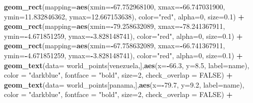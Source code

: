 \documentclass[12pt,oneside]{reedthesis}
\newenvironment{Shaded}{\begin{snugshade}}{\end{snugshade}}
\newcommand{\DataTypeTok}[1]{\textcolor[rgb]{0.13,0.29,0.53}{#1}}
\newcommand{\DecValTok}[1]{\textcolor[rgb]{0.00,0.00,0.81}{#1}}
\newcommand{\FloatTok}[1]{\textcolor[rgb]{0.00,0.00,0.81}{#1}}
\newcommand{\KeywordTok}[1]{\textcolor[rgb]{0.13,0.29,0.53}{\textbf{#1}}}
\newcommand{\NormalTok}[1]{#1}
\newcommand{\OperatorTok}[1]{\textcolor[rgb]{0.81,0.36,0.00}{\textbf{#1}}}
\newcommand{\OtherTok}[1]{\textcolor[rgb]{0.56,0.35,0.01}{#1}}
\newcommand{\StringTok}[1]{\textcolor[rgb]{0.31,0.60,0.02}{#1}}
\begin{document}
\begin{Shaded}
\begin{Highlighting}[]
\StringTok{  }\KeywordTok{geom_rect}\NormalTok{(}\DataTypeTok{mapping=}\KeywordTok{aes}\NormalTok{(}\DataTypeTok{xmin=}\OperatorTok{-}\FloatTok{67.752968100}\NormalTok{, }\DataTypeTok{xmax=}\OperatorTok{-}\FloatTok{66.747031900}\NormalTok{, }\DataTypeTok{ymin=}\FloatTok{11.832846362}\NormalTok{, }\DataTypeTok{ymax=}\FloatTok{12.667153638}\NormalTok{), }\DataTypeTok{color=}\StringTok{"red"}\NormalTok{, }\DataTypeTok{alpha=}\DecValTok{0}\NormalTok{, }\DataTypeTok{size=}\FloatTok{0.1}\NormalTok{) }\OperatorTok{+}
\StringTok{  }\KeywordTok{geom_rect}\NormalTok{(}\DataTypeTok{mapping=}\KeywordTok{aes}\NormalTok{(}\DataTypeTok{xmin=}\OperatorTok{-}\FloatTok{79.258632089}\NormalTok{, }\DataTypeTok{xmax=}\OperatorTok{-}\FloatTok{78.241367911}\NormalTok{, }\DataTypeTok{ymin=}\OperatorTok{-}\FloatTok{4.671851259}\NormalTok{, }\DataTypeTok{ymax=}\OperatorTok{-}\FloatTok{3.828148741}\NormalTok{), }\DataTypeTok{color=}\StringTok{"red"}\NormalTok{, }\DataTypeTok{alpha=}\DecValTok{0}\NormalTok{, }\DataTypeTok{size=}\FloatTok{0.1}\NormalTok{) }\OperatorTok{+}
\StringTok{  }\KeywordTok{geom_rect}\NormalTok{(}\DataTypeTok{mapping=}\KeywordTok{aes}\NormalTok{(}\DataTypeTok{xmin=}\OperatorTok{-}\FloatTok{67.758632089}\NormalTok{, }\DataTypeTok{xmax=}\OperatorTok{-}\FloatTok{66.741367911}\NormalTok{, }\DataTypeTok{ymin=}\OperatorTok{-}\FloatTok{4.671851259}\NormalTok{, }\DataTypeTok{ymax=}\OperatorTok{-}\FloatTok{3.828148741}\NormalTok{), }\DataTypeTok{color=}\StringTok{"red"}\NormalTok{, }\DataTypeTok{alpha=}\DecValTok{0}\NormalTok{, }\DataTypeTok{size=}\FloatTok{0.1}\NormalTok{) }\OperatorTok{+}
\StringTok{  }\KeywordTok{geom_text}\NormalTok{(}\DataTypeTok{data=}\NormalTok{ world_points[venezuela,],}\KeywordTok{aes}\NormalTok{(}\DataTypeTok{x=}\OperatorTok{-}\FloatTok{66.3}\NormalTok{, }\DataTypeTok{y=}\FloatTok{8.5}\NormalTok{, }\DataTypeTok{label=}\NormalTok{name), }\DataTypeTok{color =} \StringTok{"darkblue"}\NormalTok{, }\DataTypeTok{fontface =} \StringTok{"bold"}\NormalTok{, }\DataTypeTok{size=}\DecValTok{2}\NormalTok{, }\DataTypeTok{check_overlap =} \OtherTok{FALSE}\NormalTok{) }\OperatorTok{+}
\StringTok{  }\KeywordTok{geom_text}\NormalTok{(}\DataTypeTok{data=}\NormalTok{ world_points[panama,],}\KeywordTok{aes}\NormalTok{(}\DataTypeTok{x=}\OperatorTok{-}\FloatTok{79.7}\NormalTok{, }\DataTypeTok{y=}\FloatTok{9.2}\NormalTok{, }\DataTypeTok{label=}\NormalTok{name), }\DataTypeTok{color =} \StringTok{"darkblue"}\NormalTok{, }\DataTypeTok{fontface =} \StringTok{"bold"}\NormalTok{, }\DataTypeTok{size=}\DecValTok{2}\NormalTok{, }\DataTypeTok{check_overlap =} \OtherTok{FALSE}\NormalTok{) }\OperatorTok{+}\StringTok{ }

\end{Highlighting}
\end{Shaded}
\end{document}
